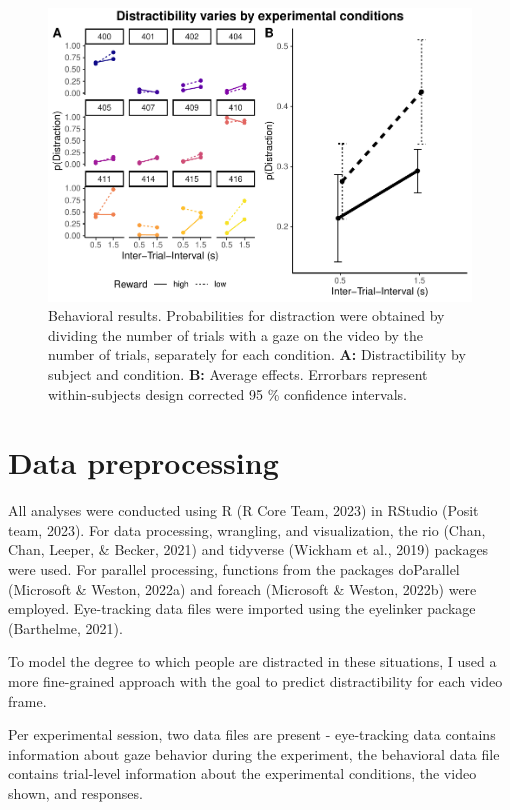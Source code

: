 \documentclass[
  man]{apa6}
\begin{document}
\begin{figure}
\centering
\includegraphics{FinalReport_files/figure-latex/behavioral-1.pdf}
\caption{\label{fig:behavioral}Behavioral results. Probabilities for distraction were obtained by dividing the number of trials with a gaze on the video by the number of trials, separately for each condition. \textbf{A:} Distractibility by subject and condition. \textbf{B:} Average effects. Errorbars represent within-subjects design corrected 95 \% confidence intervals.}
\end{figure}

\hypertarget{data-preprocessing}{%
\section{Data preprocessing}\label{data-preprocessing}}

All analyses were conducted using R (R Core Team, 2023) in RStudio (Posit team, 2023). For data processing, wrangling, and visualization, the rio (Chan, Chan, Leeper, \& Becker, 2021) and tidyverse (Wickham et al., 2019) packages were used. For parallel processing, functions from the packages doParallel (Microsoft \& Weston, 2022a) and foreach (Microsoft \& Weston, 2022b) were employed. Eye-tracking data files were imported using the eyelinker package (Barthelme, 2021).

To model the degree to which people are distracted in these situations, I used a more fine-grained approach with the goal to predict distractibility for each video frame.

Per experimental session, two data files are present - eye-tracking data contains information about gaze behavior during the experiment, the behavioral data file contains trial-level information about the experimental conditions, the video shown, and responses.
\end{document}
